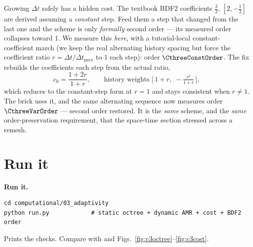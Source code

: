 Growing $\Delta t$ safely has a hidden cost. The textbook BDF2
coefficients $\tfrac32,\,[2,-\tfrac12]$ are derived assuming a
\emph{constant} step. Feed them a step that changed from the last one and
the scheme is only \emph{formally} second order --- its measured order
collapses toward 1. We measure this \emph{here}, with a tutorial-local
constant-coefficient march (we keep the real alternating history spacing
but force the coefficient ratio $r=\Delta t/\Delta t_{\text{prev}}$ to $1$
each step): order $\CthreeConstOrder$. The fix rebuilds the coefficients
each step from the actual ratio,
%
\begin{equation}
  c_0 = \frac{1+2r}{1+r},\qquad
  \text{history weights } \big[\,1+r,\; -\tfrac{r^2}{1+r}\,\big],
\end{equation}
%
which reduces to the constant-step form at $r=1$ and stays consistent when
$r\ne1$. The brick uses it, and the same alternating sequence now measures
order $\CthreeVarOrder$ --- second order restored. It is the \emph{same}
scheme, and the \emph{same} order-preservation requirement, that the
space-time section stressed across a remesh.

\section{Run it}

\begin{runbox}
\textbf{Run it.}
\begin{lstlisting}
cd computational/03_adaptivity
python run.py            # static octree + dynamic AMR + cost + BDF2 order
\end{lstlisting}
Prints the  checks. Compare with  and
Figs.~\ref{fig:c3octree}--\ref{fig:c3cost}.
\end{runbox}

